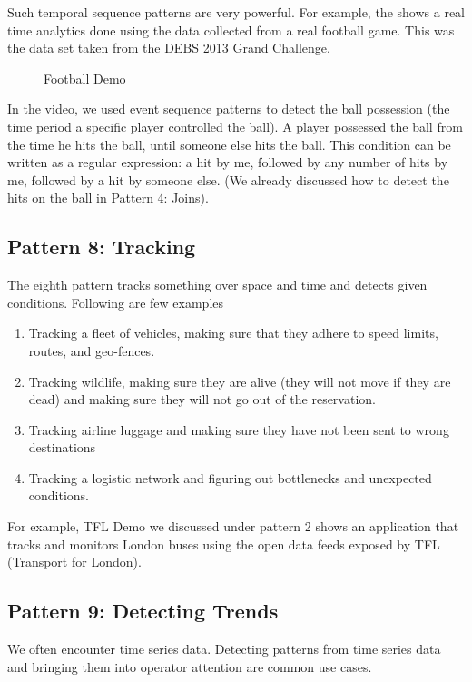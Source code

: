 \documentclass{sig-alternate}
\begin{document}
Such temporal sequence patterns are very powerful. For example, the \cite{footballDemo} shows a real time analytics done using the data collected from a real football game. This was the data set taken from the DEBS 2013 Grand Challenge. 

\begin{figure}[!htbp]
\centering
{}
\caption{Football Demo}
\label{fig:q2}
\end{figure}

In the video, we used event sequence patterns to detect the ball possession (the time period a specific player controlled the ball). A player possessed the ball from the time he hits the ball, until someone else hits the ball. This condition can be written as a regular expression: a hit by me, followed by any number of hits by me, followed by a hit by someone else.  (We already discussed how to detect the hits on the ball in Pattern 4: Joins).  

\subsection{Pattern 8: Tracking}
The eighth pattern tracks something over space and time and detects given conditions. Following are few examples 
\begin{enumerate}
\item Tracking a fleet of vehicles, making sure that they adhere to speed limits, routes,  and geo-fences. 
\item Tracking wildlife, making sure they are alive (they will not move if they are dead) and making sure they will not go out of the reservation. 
\item Tracking airline luggage and making sure they have not been sent to wrong destinations
\item Tracking a logistic network and figuring out bottlenecks and unexpected conditions. 
\end{enumerate}

For example, TFL Demo we discussed under pattern 2 shows an application that tracks and monitors London buses using the open data feeds exposed by TFL (Transport for London). 


\subsection{Pattern 9: Detecting Trends}
We often encounter time series data. Detecting patterns from time series data and bringing them into operator attention are common use cases. 
\end{document}
